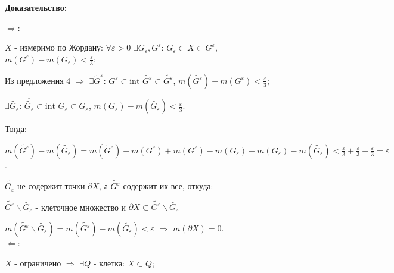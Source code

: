 \documentclass[a4paper,12pt]{article} %
\begin{document}
	\textbf{Доказательство:}
	
	$\Longrightarrow$:
	
	$X$ - измеримо по Жордану: $\forall \varepsilon > 0$ $\exists G_{\varepsilon}, G^{\varepsilon}$: $G_{\varepsilon} \subset X \subset G^{\varepsilon}$, \\$m(G^{\varepsilon}) - m(G_{\varepsilon}) < \frac{\varepsilon}{3}$;
	
	\vspace{2mm}
	
	Из предложения 4 $\Rightarrow$ $\exists \widetilde{G}^{\varepsilon}$: $\overline{G^{\varepsilon}} \subset \text{int } \widetilde{G^{\varepsilon}} \subset \widetilde{G^{\varepsilon}}$, $m(\widetilde{G^{\varepsilon}}) - m(G^{\varepsilon}) < \frac{\varepsilon}{3}$;
	
	$\exists \widetilde{G_{\varepsilon}}$: $\overline{\widetilde{G_{\varepsilon}}} \subset \text{int } G_{\varepsilon} \subset G_{\varepsilon}$, $m(G_{\varepsilon}) - m(\widetilde{G_{\varepsilon}}) < \frac{\varepsilon}{3}$.
	
	\vspace{2mm}
	
	Тогда: 
	
	$m(\widetilde{G^{\varepsilon}}) - m(\widetilde{G_{\varepsilon}}) = m(\widetilde{G^{\varepsilon}}) - m(G^{\varepsilon}) + m(G^{\varepsilon}) - m(G_{\varepsilon}) + m(G_{\varepsilon}) - m(\widetilde{G_{\varepsilon}}) < \frac{\varepsilon}{3} + \frac{\varepsilon}{3} + \frac{\varepsilon}{3}  = \varepsilon$.
	
	\vspace{2mm}
	
	$\widetilde{G_{\varepsilon}}$ не содержит точки $\partial X$, а $\widetilde{G^{\varepsilon}}$ содержит их все, откуда:
	
	$\widetilde{G^{\varepsilon}} \backslash \widetilde{G_{\varepsilon}}$ - клеточное множество и $\partial X \subset \widetilde{G^{\varepsilon}} \backslash \widetilde{G_{\varepsilon}}$
	
	$m(\widetilde{G^{\varepsilon}} \backslash \widetilde{G_{\varepsilon}}) = m(\widetilde{G^{\varepsilon}}) - m(\widetilde{G_{\varepsilon}}) < \varepsilon$ $\Rightarrow$ $m(\partial X) = 0$.\\
	
	
	$\Longleftarrow$:
	
	$X$ - ограничено $\Rightarrow$ $\exists Q$ - клетка: $X \subset Q$;
	
	\vspace{2mm}
	
\end{document}
